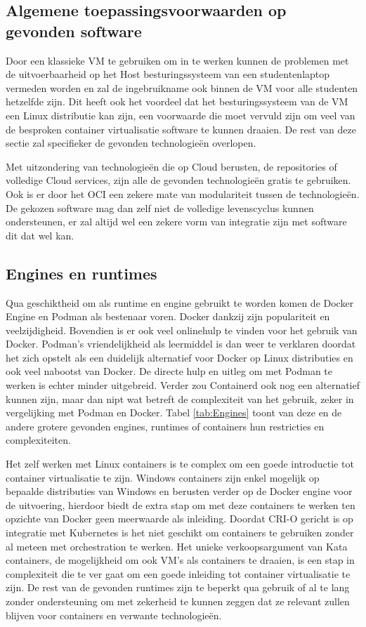 \subsection{Algemene toepassingsvoorwaarden op gevonden software}
Door een klassieke VM te gebruiken om in te werken kunnen de problemen met de uitvoerbaarheid op het Host besturingssysteem van een studentenlaptop vermeden worden en zal de ingebruikname ook binnen de VM voor alle studenten hetzelfde zijn. Dit heeft ook het voordeel dat het besturingssysteem van de VM een Linux distributie kan zijn, een voorwaarde die moet vervuld zijn om veel van de besproken container virtualisatie software te kunnen draaien. De rest van deze sectie zal specifieker de gevonden technologieën overlopen.

Met uitzondering van technologieën die op Cloud berusten, de repositories of volledige Cloud services, zijn alle de gevonden technologieën gratis te gebruiken. Ook is er door het OCI een zekere mate van modulariteit tussen de technologieën. De gekozen software mag dan zelf niet de volledige levenscyclus kunnen ondersteunen, er zal altijd wel een zekere vorm van integratie zijn met software dit dat wel kan.

\subsection{Engines en runtimes}
Qua geschiktheid om als runtime en engine gebruikt te worden komen de Docker Engine en Podman als bestenaar voren. Docker dankzij zijn populariteit en veelzijdigheid. Bovendien is er ook veel onlinehulp te vinden voor het gebruik van Docker. Podman’s vriendelijkheid als leermiddel is dan weer te verklaren doordat het zich opstelt als een duidelijk alternatief voor Docker op Linux distributies en ook veel nabootst van Docker. De directe hulp en uitleg om met Podman te werken is echter minder uitgebreid. Verder zou Containerd ook nog een alternatief kunnen zijn, maar dan nipt wat betreft de complexiteit van het gebruik, zeker in vergelijking met Podman en Docker. Tabel \ref{tab:Engines} toont van deze en de andere grotere gevonden engines, runtimes of containers hun restricties en complexiteiten. 

Het zelf werken met Linux containers is te complex om een goede introductie tot container virtualisatie te zijn. Windows containers zijn enkel mogelijk op bepaalde distributies van Windows en berusten verder op de Docker engine voor de uitvoering, hierdoor biedt de extra stap om met deze containers te werken ten opzichte van Docker geen meerwaarde als inleiding. Doordat CRI-O gericht is op integratie met Kubernetes is het niet geschikt om containers te gebruiken zonder al meteen met orchestration te werken. Het unieke verkoopsargument van Kata containers, de mogelijkheid om ook VM’s als containers te draaien, is een stap in complexiteit die te ver gaat om een goede inleiding tot container virtualisatie te zijn. De rest van de gevonden runtimes zijn te beperkt qua gebruik of al te lang zonder ondersteuning om met zekerheid te kunnen zeggen dat ze relevant zullen blijven voor containers en verwante technologieën. 


